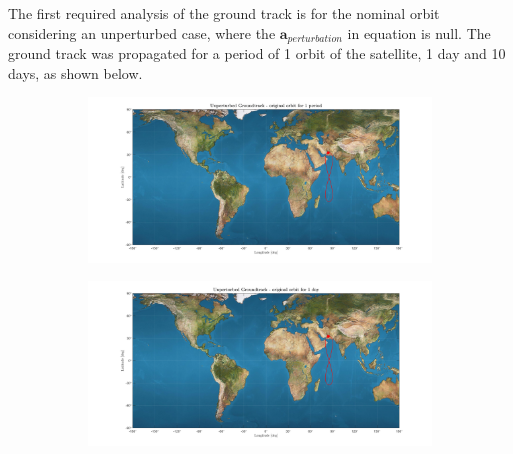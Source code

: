 \documentclass{article}
\begin{document}
The first required analysis of the ground track is for the nominal orbit considering an unperturbed case, where the $\mathbf{a}_{perturbation}$ in equation is null. The ground track was propagated for a period of 1 orbit of the satellite, 1 day and 10 days, as shown below.\\
\begin{figure}[ht]
	\centering
	\begin{subfigure}[b]{0.45\textwidth}
		\includegraphics[width=\textwidth]{ug1orb.png}
		\caption{}
		\label{fig:1a}
	\end{subfigure}
	\hfill
	\begin{subfigure}[b]{0.45\textwidth}
		\includegraphics[width=\textwidth]{ug1d.png}
		\caption{}
		\label{fig:1b}
	\end{subfigure}
	

\end{figure}
\end{document}
